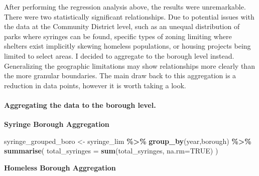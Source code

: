 \documentclass[
]{article}
\newenvironment{Shaded}{\begin{snugshade}}{\end{snugshade}}
\newcommand{\AttributeTok}[1]{\textcolor[rgb]{0.13,0.29,0.53}{#1}}
\newcommand{\ConstantTok}[1]{\textcolor[rgb]{0.56,0.35,0.01}{#1}}
\newcommand{\FunctionTok}[1]{\textcolor[rgb]{0.13,0.29,0.53}{\textbf{#1}}}
\newcommand{\NormalTok}[1]{#1}
\newcommand{\OtherTok}[1]{\textcolor[rgb]{0.56,0.35,0.01}{#1}}
\newcommand{\SpecialCharTok}[1]{\textcolor[rgb]{0.81,0.36,0.00}{\textbf{#1}}}
\begin{document}
After performing the regression analysis above, the results were
unremarkable. There were two statistically significant relationships.
Due to potential issues with the data at the Community District level,
such as an unequal distribution of parks where syringes can be found,
specific types of zoning limiting where shelters exist implicitly
skewing homeless populations, or housing projects being limited to
select areas. I decided to aggregate to the borough level instead.
Generalizing the geographic limitations may show relationships more
clearly than the more granular boundaries. The main draw back to this
aggregation is a reduction in data points, however it is worth taking a
look.

\paragraph{Aggregating the data to the borough
level.}\label{aggregating-the-data-to-the-borough-level.}

\textbf{Syringe Borough Aggregation}

\begin{Shaded}
\begin{Highlighting}[]
\NormalTok{syringe\_grouped\_boro }\OtherTok{\textless{}{-}}\NormalTok{ syringe\_lim }\SpecialCharTok{\%\textgreater{}\%} 
  \FunctionTok{group\_by}\NormalTok{(year,borough) }\SpecialCharTok{\%\textgreater{}\%}
  \FunctionTok{summarise}\NormalTok{(}
    \AttributeTok{total\_syringes =} \FunctionTok{sum}\NormalTok{(total\_syringes, }\AttributeTok{na.rm=}\ConstantTok{TRUE}\NormalTok{)}
\NormalTok{    )}
\end{Highlighting}
\end{Shaded}

\textbf{Homeless Borough Aggregation}
\end{document}
